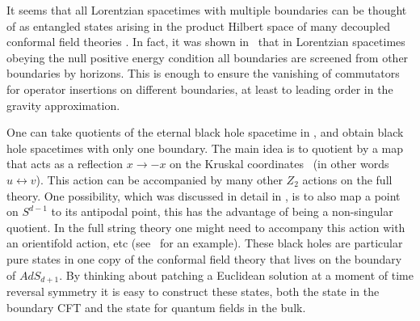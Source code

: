 It seems  that all Lorentzian spacetimes with 
multiple boundaries can be thought of as entangled states arising 
in the product Hilbert space of many decoupled conformal field 
theories \gallowaytwo  . 
In fact, it was shown  in  \gallowaytwo \gallowayone \ that in 
Lorentzian spacetimes obeying the null positive energy condition
all boundaries are screened from other boundaries by horizons. This 
is enough to ensure the vanishing of commutators for operator insertions
on different boundaries, at least to leading order in the gravity 
approximation. 




One can take quotients of the eternal black hole spacetime in 
\penrose , and obtain black hole spacetimes with only one boundary. 
The main idea is to quotient by a map that acts as a  reflection
$x\to -x$ on the Kruskal coordinates \kruskalcoord\ (in other
words $u \leftrightarrow v$). This action can be accompanied by 
many other $Z_2$ actions on the full theory. 
One possibility, which was discussed in detail in \geonads , is
to also 
map a point on $S^{d-1}$  to its antipodal point, this has the
advantage of being a non-singular quotient.  
In the full string theory one might need to accompany this action
with an orientifold action, etc (see \horava\ for an  example). 
These black holes
are particular pure 
states in one copy of the conformal field theory that
lives on the boundary of $AdS_{d+1}$. By thinking about patching 
a Euclidean solution at a moment of time reversal symmetry it is 
easy to construct these states, both the state in 
 the boundary CFT and the  state for quantum  fields in the bulk.


\ifig{}
{}


